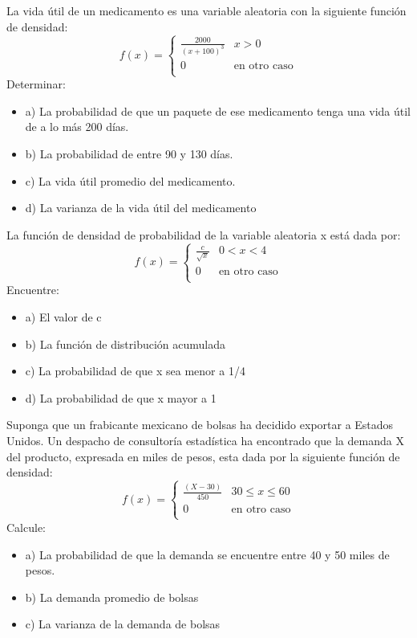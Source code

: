 \documentclass{../oxmathproblems}
\begin{document}
\begin{questions}

\miquestion La vida útil de un medicamento es una variable aleatoria con la siguiente función de densidad: 
\[   
f(x) = 
     \begin{cases}
       \frac{2000}{(x+100)^3} & x > 0 \\
       0 & \text{en otro caso} \\
     \end{cases}
\]
$$$$
Determinar: 
\begin{itemize}
\item  a) La probabilidad de que un paquete de ese medicamento tenga una vida útil de a lo más 200 días. 
\item  b) La probabilidad de entre 90 y 130 días.
\item  c) La vida útil promedio del medicamento. 
\item  d) La varianza de la vida útil del medicamento
\end{itemize}

\miquestion La función de densidad de probabilidad de la variable aleatoria x está dada por: 
\[ 
f(x) = 
     \begin{cases}
       \frac{c}{\sqrt{x}} & 0 <x < 4 \\
       0 & \text{en otro caso} \\
     \end{cases}
\]
$$$$
Encuentre:  
\begin{itemize}
\item  a) El valor de c
\item  b) La función de distribución acumulada 
\item  c) La probabilidad de que x sea menor a 1/4 
\item  d) La probabilidad de que x mayor a 1
\end{itemize}

\miquestion Suponga que un frabicante mexicano de bolsas ha decidido exportar a Estados Unidos. Un despacho de consultoría estadística ha encontrado que la demanda X del producto, expresada en miles de pesos, esta dada por la siguiente función de densidad: 
\[ 
f(x) = 
     \begin{cases}
       \frac{(X-30)}{450}  & 30  \leq x  \leq 60 \\
       0 & \text{en otro caso} \\
     \end{cases}
\]
$$$$
Calcule: 
\begin{itemize}
\item  a) La probabilidad de que la demanda se encuentre entre 40 y 50 miles de pesos. 
\item  b) La demanda promedio de bolsas 
\item  c) La varianza de la demanda de bolsas
\end{itemize}


\end{questions}
\end{document}
